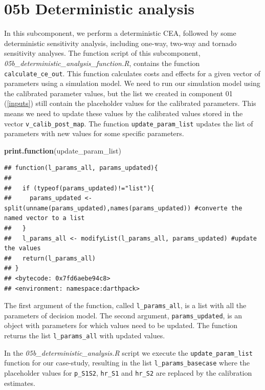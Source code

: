 \documentclass[]{book}
\newenvironment{Shaded}{\begin{snugshade}}{\end{snugshade}}
\newcommand{\KeywordTok}[1]{\textcolor[rgb]{0.13,0.29,0.53}{\textbf{#1}}}
\newcommand{\NormalTok}[1]{#1}
\begin{document}
\section{05b Deterministic analysis}\label{Deterministic-analysis}

In this subcomponent, we perform a deterministic CEA, followed by some
deterministic sensitivity analysis, including one-way, two-way and
tornado sensitivity analyses. The function script of this subcomponent,
\emph{05b\_deterministic\_analysis\_function.R}, contains the function
\texttt{calculate\_ce\_out}. This function calculates costs and effects
for a given vector of parameters using a simulation model. We need to
run our simulation model using the calibrated parameter values, but the
list we created in component 01 (\ref{inputs}) still contain the
placeholder values for the calibrated parameters. This means we need to
update these values by the calibrated values stored in the vector
\texttt{v\_calib\_post\_map}. The function \texttt{update\_param\_list}
updates the list of parameters with new values for some specific
parameters.

\begin{Shaded}
\begin{Highlighting}[]
\KeywordTok{print.function}\NormalTok{(update_param_list)}
\end{Highlighting}
\end{Shaded}

\begin{verbatim}
## function(l_params_all, params_updated){
##   
##   if (typeof(params_updated)!="list"){
##     params_updated <- split(unname(params_updated),names(params_updated)) #converte the named vector to a list
##   }
##   l_params_all <- modifyList(l_params_all, params_updated) #update the values
##   return(l_params_all)
## }
## <bytecode: 0x7fd6aebe94c8>
## <environment: namespace:darthpack>
\end{verbatim}

The first argument of the function, called \texttt{l\_params\_all}, is a
list with all the parameters of decision model. The second argument,
\texttt{params\_updated}, is an object with parameters for which values
need to be updated. The function returns the list
\texttt{l\_params\_all} with updated values.

In the \emph{05b\_deterministic\_analysis.R} script we execute the
\texttt{update\_param\_list} function for our case-study, resulting in
the list \texttt{l\_params\_basecase} where the placeholder values for
\texttt{p\_S1S2}, \texttt{hr\_S1} and \texttt{hr\_S2} are replaced by
the calibration estimates.
\end{document}
